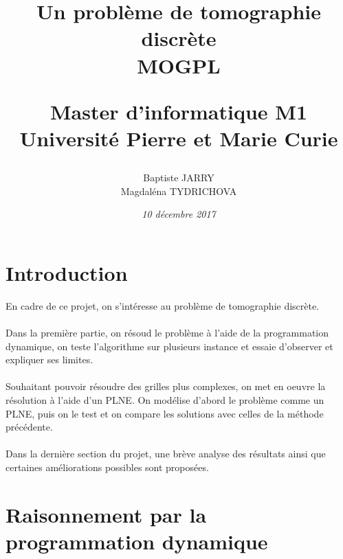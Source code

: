 \documentclass[10pt,a4paper]{article}
\title{%
        \LARGE \textbf {Un problème de tomographie discrète}\\
        \vspace{8mm}
        \large \textbf{MOGPL}\\
        \vspace{10mm}
        \author{Baptiste JARRY \\ Magdaléna TYDRICHOVA}
        \large {Master d'informatique M1}\\
          \vspace{5mm}
        \large {Université Pierre et Marie Curie \vspace{15mm}}\\ 
        \date{\vspace{10mm} \textsf{\textrm{\textit{10 décembre 2017}}}}}
\begin{document}
\maketitle
\thispagestyle{empty}
\newpage
\section*{Introduction}
\addtocounter{page}{-1}
\noindent
En cadre de ce projet, on s'intéresse au problème de tomographie discrète. \\ \\
\noindent
Dans la première partie, on résoud le problème à l'aide de la programmation dynamique, on teste l'algorithme sur plusieurs instance et essaie d'observer et expliquer ses limites. \\ \\
\noindent
Souhaitant pouvoir résoudre des grilles plus complexes, on met en oeuvre la résolution à l'aide d'un PLNE. On modélise d'abord le problème comme un PLNE, puis on le test et on compare les solutions avec celles de la méthode précédente. \\ \\ 
\noindent
Dans la dernière section du projet, une brève analyse des résultats ainsi que certaines améliorations possibles sont proposées. 
\newpage
\section{Raisonnement par la programmation dynamique}
\end{document}
